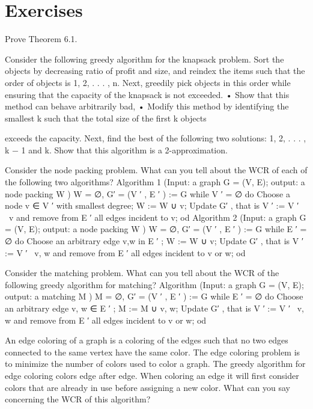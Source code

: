 \section*{Exercises}
\begin{exercise}
Prove Theorem 6.1.
\end{exercise}

\begin{exercise}
Consider the following greedy algorithm for the knapsack problem. Sort the objects by decreasing ratio
of profit and size, and reindex the items such that the order of objects is 1, 2, . . . , n. Next, greedily pick
objects in this order while ensuring that the capacity of the knapsack is not exceeded.
• Show that this method can behave arbitrarily bad,
• Modify this method by identifying the smallest k such that the total size of the first k objects

exceeds the capacity. Next, find the best of the following two solutions: {1, 2, . . . , k − 1} and {k}.
Show that this algorithm is a 2-approximation.
\end{exercise}

\begin{exercise}
Consider the node packing problem. What can you tell about the WCR of each of the following two
algorithms?
Algorithm 1 (Input: a graph G = (V, E); output: a node packing W )
W = ∅, G′ = (V ′ , E ′ ) := G
while V ′ = ∅
do
Choose a node v ∈ V ′ with smallest degree;
W := W ∪ {v};
Update G′ , that is V ′ := V ′ \ {v} and remove from E ′ all edges incident to v;
od
Algorithm 2 (Input: a graph G = (V, E); output: a node packing W )
W = ∅, G′ = (V ′ , E ′ ) := G
while E ′ = ∅
do
Choose an arbitrary edge {v,w} in E ′ ;
W := W ∪ {v};
Update G′ , that is V ′ := V ′ \ {v, w} and remove from E ′ all edges incident to v or w;
od
\end{exercise}

\begin{exercise}
Consider the matching problem. What can you tell about the WCR of the following greedy algorithm
for matching?
Algorithm (Input: a graph G = (V, E); output: a matching M )
M = ∅, G′ = (V ′ , E ′ ) := G
while E ′ = ∅
do
Choose an arbitrary edge {v, w} ∈ E ′ ;
M := M ∪ {v, w};
Update G′ , that is V ′ := V ′ \ {v, w} and remove from E ′ all edges incident to v or w;
od
\end{exercise}

\begin{exercise}
An edge coloring of a graph is a coloring of the edges such that no two edges connected to the same
vertex have the same color. The edge coloring problem is to minimize the number of colors used to color
a graph. The greedy algorithm for edge coloring colors edge after edge. When coloring an edge it will
first consider colors that are already in use before assigning a new color. What can you say concerning
the WCR of this algorithm?
\end{exercise}


